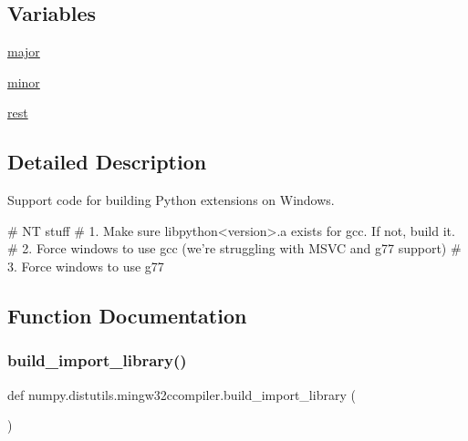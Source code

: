 \subsection*{Variables}
\begin{DoxyCompactItemize}
\item 
\hyperlink{namespacenumpy_1_1distutils_1_1mingw32ccompiler_a2548dd710d35e11cc211f661c1e5996e}{major}
\item 
\hyperlink{namespacenumpy_1_1distutils_1_1mingw32ccompiler_ae64a19d31b7408e3c5ea1a16d92eeb6e}{minor}
\item 
\hyperlink{namespacenumpy_1_1distutils_1_1mingw32ccompiler_a86dac28a8fec6c8d65697c892052136c}{rest}
\end{DoxyCompactItemize}


\subsection{Detailed Description}
\begin{DoxyVerb}Support code for building Python extensions on Windows.

    # NT stuff
    # 1. Make sure libpython<version>.a exists for gcc.  If not, build it.
    # 2. Force windows to use gcc (we're struggling with MSVC and g77 support)
    # 3. Force windows to use g77\end{DoxyVerb}
 

\subsection{Function Documentation}
\mbox{\label{namespacenumpy_1_1distutils_1_1mingw32ccompiler_a8ab45cb917a0b238041a8a685b55a976}} 
\subsubsection{\texorpdfstring{build\+\_\+import\+\_\+library()}{build\_import\_library()}}
{\footnotesize\ttfamily def numpy.\+distutils.\+mingw32ccompiler.\+build\+\_\+import\+\_\+library (\begin{DoxyParamCaption}{ }\end{DoxyParamCaption})}

